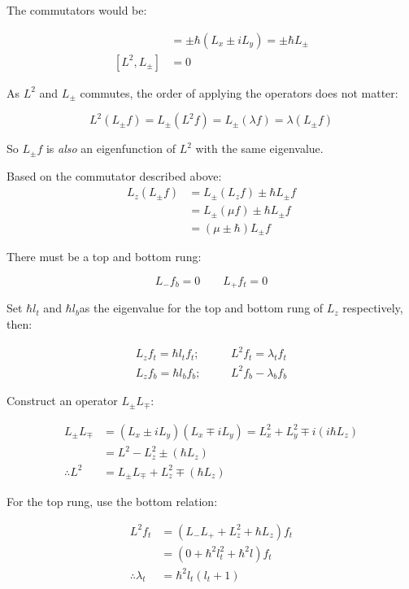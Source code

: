 \documentclass[12pt]{article}
\begin{document}
The commutators would be:

\begin{align*}
 [L_z, L_\pm] &= \pm\hbar(L_x \pm iL_y) = \pm\hbar L_\pm\\
 [L^2, L_\pm] &= 0
\end{align*}

As $L^2$ and $L_\pm$ commutes, the order of applying the operators does not matter:

\[L^2(L_\pm f) = L_\pm(L^2 f) = L_\pm(\lambda f) = \lambda (L_\pm f)\]

So  $L_\pm f$ is \textit{also} an eigenfunction of $L^2$ with the same eigenvalue. 

Based on the commutator described above:
\begin{align*}
    L_z(L_\pm f) &= L_\pm (L_z f) \pm \hbar  L_\pm f \\
    &= L_\pm (\mu f) \pm \hbar L_\pm f\\
    &= (\mu \pm \hbar) L_\pm f
\end{align*}

There must be a top and bottom rung:

\[ L_- f_b = 0 \qquad L_+ f_t = 0\]

Set $\hbar l_t$ and $\hbar l_b$as the eigenvalue for the top and bottom rung of $L_z$ respectively, then:

\[
\begin{matrix}
L_z f_t = \hbar l_t f_t; &\quad& L^2f_t = \lambda_t f_t\\
L_z f_b = \hbar l_b f_b; &\quad& L^2f_b - \lambda_b f_b
\end{matrix}
\]

Construct an operator $L_\pm L_\mp$:

\begin{align*}
    L_\pm L_\mp &= (L_x\pm i L_y)(L_x\mp iL_y) = L_x^2 + L_y^2 \mp i(i\hbar L_z)\\
    &= L^2 - L_z^2 \pm(\hbar L_z)\\
    \therefore L^2 &= L_\pm L_\mp + L_z^2 \mp(\hbar L_z)
\end{align*}

For the top rung, use the bottom relation:

\begin{align*}
    L^2 f_t &= (L_-L_+ + L_z^2 + \hbar L_z)f_t\\
    &= (0 + \hbar^2 l_t^2 + \hbar^2 l)f_t\\
    \therefore \lambda_t &= \hbar^2 l_t(l_t+1)
\end{align*}
\end{document}
